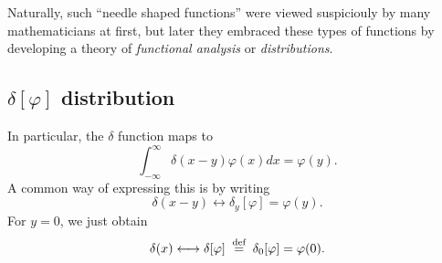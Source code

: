 Naturally, such ``needle shaped functions'' were viewed suspiciouly by many mathematicians
at first, but later they embraced these types of functions
\cite{gelfand:1964:gf} by developing a theory of
{\em functional analysis}
or
{\em distributions}.

\subsection{$\delta \left[ \varphi \right]$ distribution}

In particular, the $\delta$ function maps to
\begin{equation}
\int_{-\infty}^\infty
\delta(x-y) \varphi (x) dx = \varphi(y).
\end{equation}
A common way of expressing this is by writing
\begin{equation}
\delta(x-y) \longleftrightarrow \delta_y [\varphi] = \varphi (y).
\end{equation}
For $y=0$, we just obtain
\begin{equation}
\delta(x) \longleftrightarrow \delta [\varphi] \stackrel{{\tiny \textrm{ def }}}{=} \delta_0 [\varphi] =  \varphi (0).
\end{equation}


